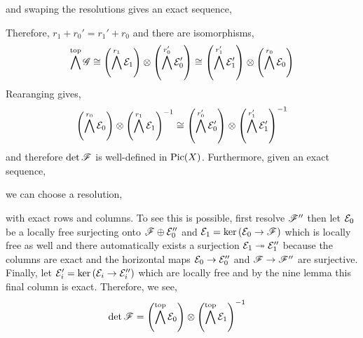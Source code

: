 \documentclass[12pt]{article}
\begin{document}
\begin{enumerate}
\begin{center}
\end{center} 
and swaping the resolutions gives an exact sequence,
\begin{center}
\end{center} 
Therefore, $r_1 + r_0' = r_1' + r_0$ and there are isomorphisms,
\[ \bigwedge^{\mathrm{top}} \mathscr{G} \cong \left( \bigwedge^{r_1} \mathcal{E}_1 \right) \otimes \left( \bigwedge^{r_0'} \mathcal{E}_0' \right) \cong \left( \bigwedge^{r_1'} \mathcal{E}_1' \right) \otimes \left( \bigwedge^{r_0} \mathcal{E}_0 \right)  \]
Rearanging gives,
\[ \left( \bigwedge^{r_0} \mathcal{E}_0 \right) \otimes \left( \bigwedge^{r_1} \mathcal{E}_1 \right)^{-1} \cong \left( \bigwedge^{r_0'} \mathcal{E}_0' \right) \otimes \left( \bigwedge^{r_1'} \mathcal{E}_1' \right)^{-1} \]
and therefore $\det{\mathscr{F}}$ is well-defined in $\mathrm{Pic}(X)$. Furthermore, given an exact sequence,
\begin{center}
\end{center}
we can choose a resolution,
\begin{center}
\end{center}
with exact rows and columns. To see this is possible, first resolve $\mathscr{F}''$ then let $\mathcal{E}_0$ be a locally free surjecting onto $\mathscr{F} \oplus \mathcal{E}_0''$ and $\mathcal{E}_1 = \ker{(\mathcal{E}_0 \to \mathscr{F})}$ which is locally free as well and there automatically exists a surjection $\mathcal{E}_1 \twoheadrightarrow \mathcal{E}_1''$ because the columns are exact and the horizontal maps $\mathcal{E}_0 \to \mathcal{E}_0''$ and $\mathscr{F} \to \mathscr{F}''$ are surjective. Finally, let $\mathcal{E}_i' = \ker{(\mathcal{E}_i \to \mathcal{E}_i'')}$ which are locally free and by the nine lemma this final column is exact. Therefore, we see,
\begin{align*}
\det{\F} & = \left( \bigwedge^{\mathrm{top}} \E_0 \right) \otimes \left( \bigwedge^{\mathrm{top}} \E_1 \right)^{-1} 

\end{align*}
\end{enumerate}
\end{document}
